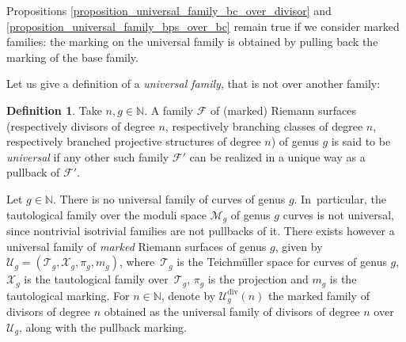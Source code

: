 \documentclass[10pt]{amsart}
\newcommand{\N}{\mathbb N}
\DeclareMathOperator{\Div}{div}
\theoremstyle{definition}
\newtheorem{definition}{Definition}[subsection]
\theoremstyle{plain}
\begin{document}
Propositions \ref{proposition_universal_family_bc_over_divisor} and \ref{proposition_universal_family_bps_over_bc} remain true if we consider marked families: the marking on the universal family is obtained by pulling back the marking of the base family.

Let us give a definition of a \emph{universal family}, that is not over another family:

\begin{definition}\label{definition_universal_family}
Take $n, g \in \N$.
A family $\mathcal F$ of (marked) Riemann surfaces (respectively divisors of degree $n$, respectively branching classes of degree $n$, respectively branched projective structures of degree $n$) of genus $g$ is said to be \emph{universal} if any other such family $\mathcal F'$ can be realized in a unique way as a pullback of $\mathcal F'$.
\end{definition}

Let $g \in \N$. There is no universal family of curves of genus $g$. In~particular, the tautological family over the moduli space $\mathcal M_g$ of genus $g$ curves is not universal, since nontrivial isotrivial families are not pullbacks of it.
There exists however a universal family of \emph{marked} Riemann surfaces of genus $g$, given by $\mathcal U_g = \left(\mathcal T_g, \mathcal X_g, \pi_g, m_g\right)$, where~$\mathcal T_g$ is the Teichmüller space for curves of genus $g$, $\mathcal X_g$ is the tautological family over~$\mathcal T_g$, $\pi_g$ is the projection and $m_g$ is the tautological marking.
For $n \in \N$, denote by $\mathcal U_g^{\Div}(n)$ the marked family of divisors of degree $n$ obtained as the universal family of divisors of degree $n$ over $\mathcal U_g$, along with the pullback marking.
\end{document}
